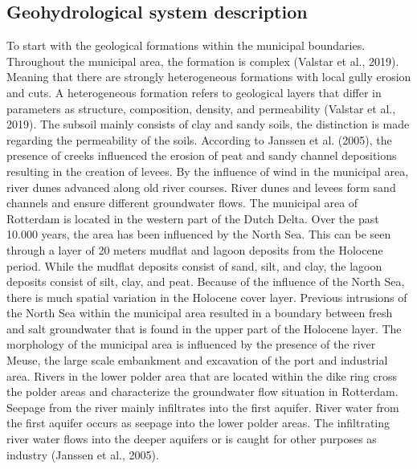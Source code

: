 \subsection{Geohydrological system description}
To start with the geological formations within the municipal boundaries. Throughout the municipal area, the formation is complex (Valstar et al., 2019). Meaning that there are strongly heterogeneous formations with local gully erosion and cuts. A heterogeneous formation refers to geological layers that differ in parameters as structure, composition, density, and permeability (Valstar et al., 2019). The subsoil mainly consists of clay and sandy soils, the distinction is made regarding the permeability of the soils. According to Janssen et al. (2005), the presence of creeks influenced the erosion of peat and sandy channel depositions resulting in the creation of levees. By the influence of wind in the municipal area, river dunes advanced along old river courses. River dunes and levees form sand channels and ensure different groundwater flows. 
The municipal area of Rotterdam is located in the western part of the Dutch Delta. Over the past 10.000 years, the area has been influenced by the North Sea. This can be seen through a layer of 20 meters mudflat and lagoon deposits from the Holocene period. While the mudflat deposits consist of sand, silt, and clay, the lagoon deposits consist of silt, clay, and peat. Because of the influence of the North Sea, there is much spatial variation in the Holocene cover layer. Previous intrusions of the North Sea within the municipal area resulted in a boundary between fresh and salt groundwater that is found in the upper part of the Holocene layer. The morphology of the municipal area is influenced by the presence of the river Meuse, the large scale embankment and excavation of the port and industrial area. Rivers in the lower polder area that are located within the dike ring cross the polder areas and characterize the groundwater flow situation in Rotterdam. Seepage from the river mainly infiltrates into the first aquifer. River water from the first aquifer occurs as seepage into the lower polder areas. The infiltrating river water flows into the deeper aquifers or is caught for other purposes as industry (Janssen et al., 2005). \\

